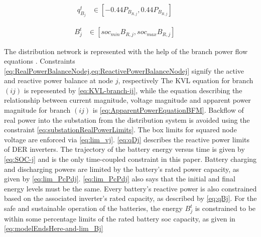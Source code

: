 \documentclass[../../outputs/main.tex]{subfiles}
\begin{document}
\vspace{-1.5em} %

\begin{align}
    { q^{t}_{B_{j}} } 
    &\in 
    { \left[-0.44P_{B_{R, j}}, 0.44P_{B_{R, j}}\right] } \label{eq:qBj} &&
\end{align}

\vspace{-1.5em} %

\begin{align}
    { B^{t}_{j} } &\in { \left[ soc_{min}B_{R, j}, soc_{max}B_{R, j} \right] } \label{eq:modelEndsHere-and-lim_Bj} &&
\end{align}

The distribution network is represented with the help of the branch power flow equations . Constraints \cref{eq:RealPowerBalanceNodej,eq:ReactivePowerBalanceNodej} signify the active and reactive power balance at node $j$, respectively
The KVL equation for branch $(ij)$ is represented by \cref{eq:KVL-branch-ij}, while the equation describing the relationship between current magnitude, voltage magnitude and apparent power magnitude for branch $(ij)$ is \cref{eq:ApparentPowerEquationBFM}. Backflow of real power into the substation from the distribution system is avoided using the constraint \cref{eq:substationRealPowerLimits}. The box limits for squared node voltage are enforced via \cref{eq:lim_vj}. \cref{eq:qDj} describes the reactive power limits of DER inverters. The trajectory of the battery energy versus time is given by \cref{eq:SOC-j} and is the only time-coupled constraint in this paper. Battery charging and discharging powers are limited by the battery's rated power capacity, as given by \cref{eq:lim_PcPdj}. \cref{eq:lim_PcPdj} also says that the initial and final energy levels must be the same. Every battery's reactive power is also constrained based on the associated inverter's rated capacity, as described by \cref{eq:qBj}. For the safe and sustainable operation of the batteries, the energy $B^{t}_{j}$ is constrained to be within some percentage limits of the rated battery soc capacity, as given in \cref{eq:modelEndsHere-and-lim_Bj}
\end{document}

